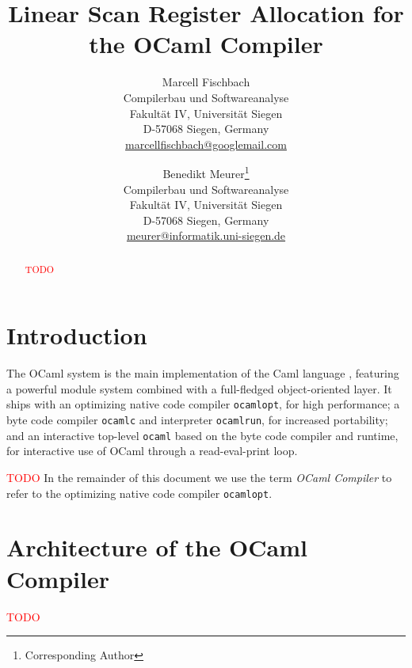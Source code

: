 \documentclass[10pt,a4paper,final,twocolumn]{article}
\begin{document}
\title{%
  Linear Scan Register Allocation for the OCaml Compiler
}
\author{%
  Marcell Fischbach \\
  Compilerbau und Softwareanalyse \\
  Fakult\"at IV, Universit\"at Siegen \\
  D-57068 Siegen, Germany \\
  \url{marcellfischbach@googlemail.com}
  \and
  Benedikt Meurer\thanks{Corresponding Author} \\
  Compilerbau und Softwareanalyse \\
  Fakult\"at IV, Universit\"at Siegen \\
  D-57068 Siegen, Germany \\
  \url{meurer@informatik.uni-siegen.de}
}
\date{}

\maketitle

\begin{abstract}
  \textcolor{red}{TODO}
\end{abstract}


\section{Introduction}

The OCaml \cite{Leroy11,Remy02} system is the main implementation of the Caml language \cite{Caml11}, featuring
a powerful module system combined with a full-fledged object-oriented layer. It ships with an optimizing native
code compiler \texttt{ocamlopt}, for high performance; a byte code compiler \texttt{ocamlc} and interpreter
\texttt{ocamlrun}, for increased portability; and an interactive top-level \texttt{ocaml} based on the byte code
compiler and runtime, for interactive use of OCaml through a read-eval-print loop.

\textcolor{red}{TODO} In the remainder of this document we use the term \emph{OCaml Compiler} to refer to the
optimizing native code compiler \texttt{ocamlopt}.


\section{Architecture of the OCaml Compiler} \label{section:Architecture_of_the_OCaml_Compiler}

\textcolor{red}{TODO}
\end{document}

